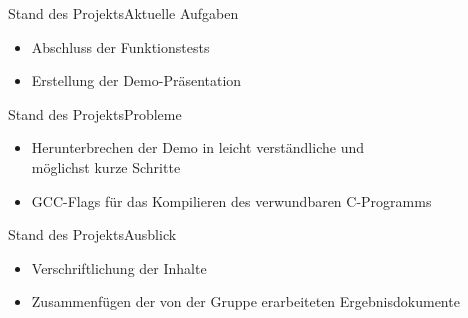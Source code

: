 \begin{frame}{Stand des Projekts}{Aktuelle Aufgaben}
    \begin{itemize}
        \item Abschluss der Funktionstests
        \item Erstellung der Demo-Präsentation
    \end{itemize}
\end{frame}

\begin{frame}{Stand des Projekts}{Probleme}
    \begin{itemize}
        \item Herunterbrechen der Demo in leicht verständliche und \\ möglichst
        kurze Schritte
        \item GCC-Flags für das Kompilieren des verwundbaren C-Programms
    \end{itemize}
\end{frame}

\begin{frame}{Stand des Projekts}{Ausblick}
    \begin{itemize}
        \item Verschriftlichung der Inhalte
        \item Zusammenfügen der von der Gruppe erarbeiteten Ergebnisdokumente
    \end{itemize}
\end{frame}